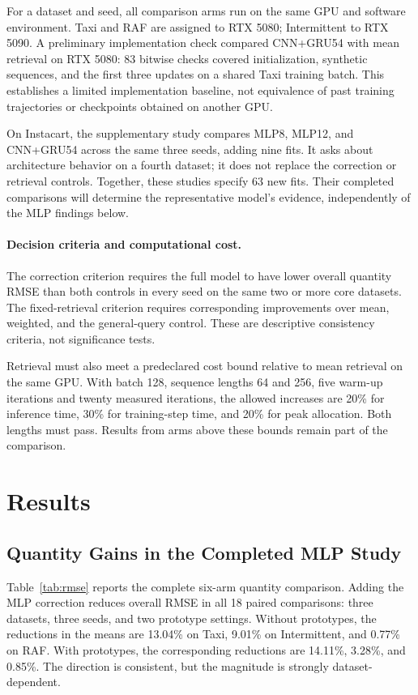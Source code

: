 \documentclass[runningheads]{llncs}
\begin{document}
For a dataset and seed, all comparison arms run on the same GPU and software environment. Taxi and RAF are assigned to RTX 5080; Intermittent to RTX 5090. A preliminary implementation check compared CNN+GRU54 with mean retrieval on RTX 5080: 83 bitwise checks covered initialization, synthetic sequences, and the first three updates on a shared Taxi training batch. This establishes a limited implementation baseline, not equivalence of past training trajectories or checkpoints obtained on another GPU.

On Instacart, the supplementary study compares MLP8, MLP12, and CNN+GRU54 across the same three seeds, adding nine fits. It asks about architecture behavior on a fourth dataset; it does not replace the correction or retrieval controls. Together, these studies specify 63 new fits. Their completed comparisons will determine the representative model's evidence, independently of the MLP findings below.

\paragraph{Decision criteria and computational cost.}
The correction criterion requires the full model to have lower overall quantity RMSE than both controls in every seed on the same two or more core datasets. The fixed-retrieval criterion requires corresponding improvements over mean, weighted, and the general-query control. These are descriptive consistency criteria, not significance tests.

Retrieval must also meet a predeclared cost bound relative to mean retrieval on the same GPU. With batch 128, sequence lengths 64 and 256, five warm-up iterations and twenty measured iterations, the allowed increases are 20\% for inference time, 30\% for training-step time, and 20\% for peak allocation. Both lengths must pass. Results from arms above these bounds remain part of the comparison.

\section{Results}
\subsection{Quantity Gains in the Completed MLP Study}
Table~\ref{tab:rmse} reports the complete six-arm quantity comparison. Adding the MLP correction reduces overall RMSE in all 18 paired comparisons: three datasets, three seeds, and two prototype settings. Without prototypes, the reductions in the means are 13.04\% on Taxi, 9.01\% on Intermittent, and 0.77\% on RAF. With prototypes, the corresponding reductions are 14.11\%, 3.28\%, and 0.85\%. The direction is consistent, but the magnitude is strongly dataset-dependent.
\end{document}
